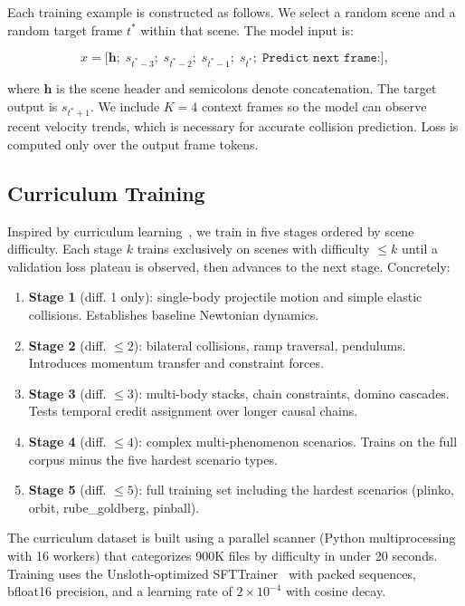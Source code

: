 \documentclass{article}
\newcommand{\vh}{\mathbf{h}}
\begin{document}
Each training example is constructed as follows. We select a random scene and a
random target frame $t^*$ within that scene. The model input is:

\begin{equation}
x = \bigl[\vh;\; s_{t^*-3};\; s_{t^*-2};\; s_{t^*-1};\; s_{t^*};\; \texttt{Predict next frame:}\bigr],
\end{equation}

where $\vh$ is the scene header and semicolons denote concatenation. The target
output is $s_{t^*+1}$. We include $K=4$ context frames so the model can observe
recent velocity trends, which is necessary for accurate collision prediction.
Loss is computed only over the output frame tokens.

\subsection{Curriculum Training}

Inspired by curriculum learning~\citep{bengio2009curriculum, graves2017automated},
we train in five stages ordered by scene difficulty. Each stage $k$ trains
exclusively on scenes with difficulty $\leq k$ until a validation loss plateau
is observed, then advances to the next stage. Concretely:

\begin{enumerate}[leftmargin=*,topsep=2pt,itemsep=1pt]
  \item \textbf{Stage 1} (diff. 1 only): single-body projectile motion and
    simple elastic collisions. Establishes baseline Newtonian dynamics.
  \item \textbf{Stage 2} (diff. $\leq 2$): bilateral collisions, ramp traversal,
    pendulums. Introduces momentum transfer and constraint forces.
  \item \textbf{Stage 3} (diff. $\leq 3$): multi-body stacks, chain constraints,
    domino cascades. Tests temporal credit assignment over longer causal chains.
  \item \textbf{Stage 4} (diff. $\leq 4$): complex multi-phenomenon scenarios.
    Trains on the full corpus minus the five hardest scenario types.
  \item \textbf{Stage 5} (diff. $\leq 5$): full training set including the hardest
    scenarios (plinko, orbit, rube\_goldberg, pinball).
\end{enumerate}

The curriculum dataset is built using a parallel scanner (Python multiprocessing
with 16 workers) that categorizes 900K files by difficulty in under 20 seconds.
Training uses the Unsloth-optimized SFTTrainer~\citep{unsloth2024} with
packed sequences, bfloat16 precision, and a learning rate of $2\times10^{-4}$
with cosine decay.
\end{document}
